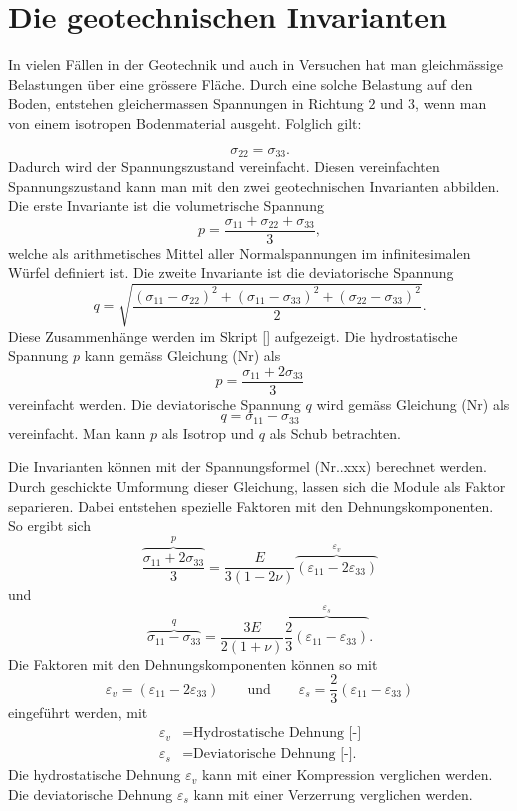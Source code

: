 \section{Die geotechnischen Invarianten\label{spannung:section:Die geotechnischen Invarianten}}
In vielen Fällen in der Geotechnik und auch in Versuchen hat man gleichmässige Belastungen über eine grössere Fläche.
Durch eine solche Belastung auf den Boden, entstehen gleichermassen Spannungen in Richtung $2$ und $3$,
wenn man von einem isotropen Bodenmaterial ausgeht.
Folglich gilt:

\[
\sigma_{22}
=
\sigma_{33}
.
\]
Dadurch wird der Spannungszustand vereinfacht.
Diesen vereinfachten Spannungszustand kann man mit den zwei geotechnischen Invarianten abbilden.
Die erste Invariante ist die volumetrische Spannung
\[
p
=
\frac{\sigma_{11}+\sigma_{22}+\sigma_{33}}{3}
,
\]
welche als arithmetisches Mittel aller Normalspannungen im infinitesimalen Würfel definiert ist.
Die zweite Invariante ist die deviatorische Spannung
\[
q
=
\sqrt{\frac{(\sigma_{11}-\sigma_{22})^{2}+(\sigma_{11}-\sigma_{33})^{2}+(\sigma_{22}-\sigma_{33})^{2}}{2}}
.
\]
Diese Zusammenhänge werden im Skript [\cite{spannung:Stoffgesetze-und-numerische-Modellierung-in-der-Geotechnik}] aufgezeigt.
Die hydrostatische Spannung $p$ kann gemäss Gleichung (Nr) als
\[
p
=
\frac{\sigma_{11}+2\sigma_{33}}{3}
\]
vereinfacht werden.
Die deviatorische Spannung $q$ wird gemäss Gleichung (Nr) als
\[
q
=
\sigma_{11}-\sigma_{33}
\]
vereinfacht. Man kann $p$ als Isotrop und $q$ als Schub betrachten.

Die Invarianten können mit der Spannungsformel (Nr..xxx) berechnet werden.
Durch geschickte Umformung dieser Gleichung, lassen sich die Module als Faktor separieren.
Dabei entstehen spezielle Faktoren mit den Dehnungskomponenten.
So ergibt sich
\[
\overbrace{\frac{\sigma_{11}+2\sigma_{33}}{3}}^{p}
=
\frac{E}{3(1-2\nu)} \overbrace{(\varepsilon_{11} - 2\varepsilon_{33})}^{\varepsilon_{v}}
\]
und
\[
\overbrace{\sigma_{11}-\sigma_{33}}^{q}
=
\frac{3E}{2(1+\nu)} \overbrace{\frac{2}{3}(\varepsilon_{11} - \varepsilon_{33})}^{\varepsilon_{s}}
.
\]
Die Faktoren mit den Dehnungskomponenten können so mit
\[
\varepsilon_{v}
=
(\varepsilon_{11} - 2\varepsilon_{33})
\qquad
\text{und}
\qquad
\varepsilon_{s}
=
\frac{2}{3}(\varepsilon_{11} - \varepsilon_{33})
\]
eingeführt werden, mit
\begin{align*}
	\varepsilon_{v} &= \text{Hydrostatische Dehnung [-]} \\
	\varepsilon_{s} &= \text{Deviatorische Dehnung [-].}
\end{align*}
Die hydrostatische Dehnung $\varepsilon_{v}$ kann mit einer Kompression verglichen werden.
Die deviatorische Dehnung $\varepsilon_{s}$  kann mit einer Verzerrung verglichen werden.

